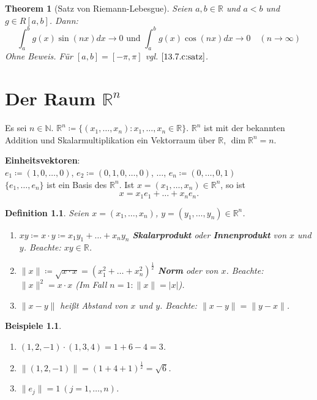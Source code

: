 \documentclass{extreport}
\newcommand{\N}{\mathbb{N}}
\newcommand{\R}{\mathbb{R}}
\theoremstyle{named}
\newtheorem{namedtheorem}{Theorem} \counterwithin{namedtheorem}{chapter}
\theoremstyle{dotless}
\newtheorem*{beispiele}{Beispiele}
\newtheorem*{definition}{Definition}
\begin{document}
\begin{namedtheorem}[Satz von Riemann-Lebesgue] \label{13.8:prop-SatzVonRiemann-Lebesgue}
	Seien $a, b \in \R$ und $a < b$ und $g \in R[a, b]$. Dann:
		$$ \int_{a}^{b} g(x) \sin(nx) dx \rightarrow 0 \text{ und } \int_{a}^{b} g(x) \cos(nx) dx \rightarrow 0 \quad (n \rightarrow \infty) $$
		Ohne Beweis. Für $[a, b] = [-\pi, \pi]$ vgl. $\ref{13.7.c:satz}$.
\end{namedtheorem}

\newpage

\chapter{Der Raum $\R^{n}$}

Es sei $n \in \N$. $\R^{n} \coloneqq \{ (x_{1}, \dotsc, x_{n}) : x_{1}, \dotsc, x_{n} \in \R \}$. $\R^{n}$ ist mit der bekannten Addition und Skalarmultiplikation ein Vektorraum über $\R$, $\dim \R^{n} = n$.

\textbf{Einheitsvektoren}: \\
$e_{1} \coloneqq (1, 0, \dotsc, 0)$, $e_{2} \coloneqq (0, 1, 0, \dotsc, 0)$, $\dotsc$, $e_{n} \coloneqq (0, \dotsc, 0, 1)$ \\
$\{ e_{1}, \dotsc, e_{n} \}$ ist ein Basis des $\R^{n}$. Ist $x = (x_{1}, \dotsc, x_{n}) \in \R^{n}$, so ist
$$ x = x_{1} e_{1} + \dotsc + x_{n} e_{n}. $$

   
\begin{definition}
	Seien $x = (x_{1}, \dotsc, x_{n})$, $y = (y_{1}, \dotsc, y_{n}) \in \R^{n}$.
	\begin{enumerate}
		\item $xy \coloneqq x \cdot y \coloneqq x_{1} y_{1} + \dotsc + x_{n} y_{n}$ \textbf{Skalarprodukt} oder \textbf{Innenprodukt} von $x$ und $y$. Beachte: $xy \in \R$.
		\item $\| x \| \coloneqq \sqrt{x \cdot x} = (x_{1}^{2} + \dotsc + x_{n}^{2})^{\frac{1}{2}}$ \textbf{Norm} oder  von $x$. Beachte: $\|x\|^{2} = x \cdot x$ (Im Fall $n = 1: \|x\| = |x|$).
		\item $\| x - y \|$ hei{\ss}t Abstand von $x$ und $y$. Beachte: $\| x - y \| = \| y - x \|$.
	\end{enumerate}
\end{definition}


\begin{beispiele} ~\
	\begin{enumerate}
		\item $(1, 2, -1) \cdot (1, 3, 4) = 1 + 6 - 4 = 3$.
		\item $\| (1, 2, -1) \| = (1 + 4 + 1)^{\frac{1}{2}} = \sqrt{6}$.
		\item $\| e_{j} \| = 1 ~(j = 1, \dotsc, n)$.
	\end{enumerate}
\end{beispiele}
\end{document}
